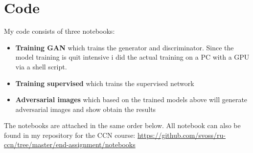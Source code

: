 \documentclass[a4paper]{article}
\begin{document}
\section{Code}
My code consists of three notebooks: 
\begin{itemize}
\item \textbf{Training GAN} which trains the generator and discriminator. Since the model training is quit intensive i did the actual training on a PC with a GPU via a shell script. 
\item \textbf{Training supervised} which trains the supervised network 
\item \textbf{Adversarial images} which based on the trained models above will generate adversarial images and show obtain the results
\end{itemize}
\noindent
The notebooks are attached in the same order below. All notebook can also be found in my repository for the CCN course: \url{https://github.com/svoss/ru-ccn/tree/master/end-assignment/notebooks}
\newpage
\end{document}
